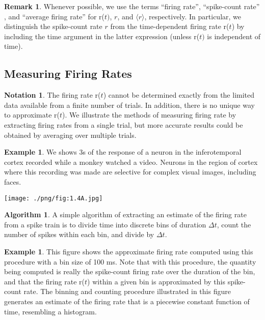 \documentclass[letterpaper,oneside]{book}
\numberwithin{equation}{chapter}
\theoremstyle{definition}
\newtheorem{alg}[thm]{Algorithm}
\newtheorem{exm}[thm]{Example}
\newtheorem{ntn}{Notation}
\newtheorem{rem}{Remark}[chapter]
\begin{document}
\begin{multicols}{2}
\begin{rem}
  Whenever possible, we use the terms “firing rate”, “spike-count rate”
, and “average firing rate” for r($t)$, $r$, and $\langle  r\rangle  $, respectively. In particular, 
we distinguish the spike-count rate $r$
from the time-dependent firing rate r($t$) by
including the time argument in the latter expression (unless r($t)$ is independent of time).
\end{rem}

\subsection{Measuring Firing Rates}

\begin{ntn}
  The firing rate r($t$) cannot be determined exactly from the limited data
available from a finite number of trials. In addition, there is no unique
way to approximate r($t$).
  We illustrate the methods of measuring firing rate by extracting
  firing rates from a single trial, but more accurate results could be obtained
  by averaging over multiple trials.
  \begin{exm}
    We shows $3$s of the response of a neuron in the inferotemporal cortex 
  recorded while a monkey watched a video. Neurons
  in the region of cortex where this recording was made are selective for
  complex visual images, including faces.
  \end{exm}
\end{ntn}
\begin{center}
  \label{fig:1.4A}
    \texttt{[image: ./png/fig:1.4A.jpg]}
  \end{center}

\begin{alg}
  A simple algorithm of extracting an estimate of the firing rate from a spike train is to divide time into
discrete bins of duration $\Delta t$, count the number of spikes within each bin,
and divide by $\Delta t$.
\end{alg}

\begin{exm}
  This figure shows the approximate firing rate computed
using this procedure with a bin size of 100 ms. Note that with this procedure, the quantity being computed is 
really the spike-count firing rate over the duration of the bin, and that the firing rate 
r($t$) within a 
given bin is approximated by this spike-count rate. The binning and counting procedure 
illustrated in this figure 
generates an estimate of the firing rate that is a piecewise constant function of time, 
resembling a histogram.
\end{exm}


\end{multicols}
\end{document}
